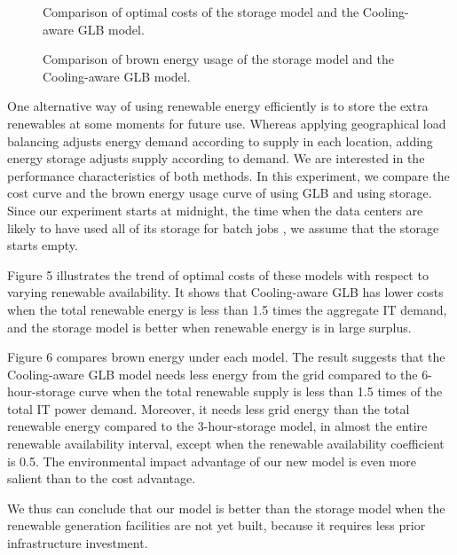 \documentclass{acm_proc_article-sp}
\begin{document}
\begin{figure}
\centering
{}
\caption{Comparison of optimal costs of the storage model and the Cooling-aware GLB model.}
\end{figure}
\begin{figure}
\centering
{}
\caption{Comparison of brown energy usage of the storage model and the Cooling-aware GLB model.}
\end{figure}
One alternative way of using renewable energy efficiently is to store the extra renewables at some moments for future use. Whereas applying geographical load balancing adjusts energy demand according to supply in each location, adding energy storage adjusts supply according to demand. We are interested in the performance characteristics of both methods. In this experiment, we compare the cost curve and the brown energy usage curve of using GLB and using storage. Since our experiment starts at midnight, the time when the data centers are likely to have used all of its storage for batch jobs \cite{adam:cooling}, we assume that the storage starts empty.

Figure 5 illustrates the trend of optimal costs of these models with respect to varying renewable availability. It shows that Cooling-aware GLB has lower costs when the total renewable energy is less than 1.5 times the aggregate IT demand, and the storage model is better when renewable energy is in large surplus.

Figure 6 compares brown energy under each model. The result suggests that the Cooling-aware GLB model needs less energy from the grid compared to the 6-hour-storage curve when the total renewable supply is less than 1.5 times of the total IT power demand. Moreover, it needs less grid energy than the total renewable energy compared to the 3-hour-storage model, in almost the entire renewable availability interval, except when the renewable availability coefficient is 0.5. The environmental impact advantage of our new model is even more salient than to the cost advantage.

We thus can conclude that our model is better than the storage model when the renewable generation facilities are not yet built, because it requires less prior infrastructure investment.
\end{document}
